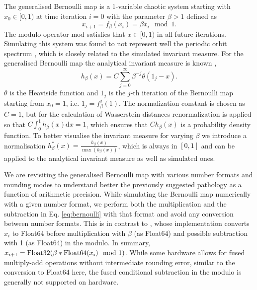 The generalised Bernoulli map \citep{Parry1960} is a 1-variable chaotic system starting with $x_0 \in [0,1)$
at time iteration $i=0$ with the parameter $\beta > 1$ defined as
\begin{equation}
	x_{i+1} = f_\beta(x_i) = \beta x_i \mod 1.
	\label{eq:bernoulli}
\end{equation}
The modulo-operator $\mathrm{mod}$ satisfies that $x \in [0,1)$ in all future iterations. Simulating this system was found to not represent
well the periodic orbit spectrum \citep{Boghosian2019}, which is closely related to the simulated invariant measure. For the
generalised Bernoulli map the analytical invariant measure is known \citep{Hofbauer1978},
\begin{equation}
	h_\beta(x) = C\sum_{j=0}^\infty \beta^{-j} \theta(1_j - x).
	\label{eq:hofbauer}
\end{equation}
$\theta$ is the Heaviside function and $1_j$ is the $j$-th iteration of the Bernoulli map starting from $x_0 = 1$, i.e. $1_j = f_\beta^j(1)$.
The normalization constant is chosen as $C=1$, but for the calculation of Wasserstein distances renormalization is applied so that
$C\int_0^1h_\beta(x) \mathrm{d}x = 1$, which ensures that $Ch_\beta(x)$ is a probability density function. To better visualise the
invariant measure for varying $\beta$ we introduce a normalisation $h_\beta^*(x) = \tfrac{h_\beta(x)}{\max(h_\beta(x))}$, which is always
in $[0,1]$ and can be applied to the analytical invariant measure as well as simulated ones.

We are revisiting the generalised Bernoulli map with various number formats and rounding modes to understand better the previously
suggested pathology \citep{Boghosian2019} as a function of arithmetic precision. While simulating the Bernoulli map numerically with
a given number format, we perform both the multiplication and the subtraction in Eq. \ref{eq:bernoulli} with that format and avoid any
conversion between number formats. This is in contrast to \cite{Boghosian2019}, whose implementation converts $x_i$ to Float64
before multiplication with $\beta$ (as Float64) and possible subtraction with 1 (as Float64) in the modulo. In summary, 
$x_{i+1} = \operatorname{Float32}(\beta * \operatorname{Float64}(x_i) \mod 1)$. While some hardware allows for fused multiply-add operations without
intermediate rounding error, similar to the conversion to Float64 here, the fused conditional subtraction in the modulo is generally not
supported on hardware.

